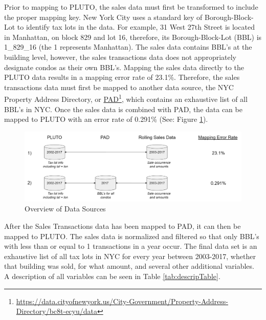 \documentclass[12pt,]{article}
\let\rmarkdownfootnote\footnote%
\def\footnote{\protect\rmarkdownfootnote}
\begin{document}
Prior to mapping to PLUTO, the sales data must first be transformed to
include the proper mapping key. New York City uses a standard key of
Borough-Block-Lot to identify tax lots in the data. For example, 31 West
27th Street is located in Manhattan, on block 829 and lot 16, therefore,
its Borough-Block-Lot (BBL) is 1\_829\_16 (the 1 represents Manhattan).
The sales data contains BBL's at the building level, however, the sales
transactions data does not appropriately designate condos as their own
BBL's. Mapping the sales data directly to the PLUTO data results in a
mapping error rate of 23.1\%. Therefore, the sales transactions data
must first be mapped to another data source, the NYC Property Address
Directory, or
\href{https://data.cityofnewyork.us/City-Government/Property-Address-Directory/bc8t-ecyu/data}{PAD}\footnote{\url{https://data.cityofnewyork.us/City-Government/Property-Address-Directory/bc8t-ecyu/data}},
which contains an exhaustive list of all BBL's in NYC. Once the sales
data is combined with PAD, the data can be mapped to PLUTO with an error
rate of 0.291\% (See: Figure \ref{fig:Data Schema}).

\begin{figure}[H]
\includegraphics[width=1\linewidth]{Sections/tables and figures/Data Schema} \caption{Overview of Data Sources}\label{fig:Data Schema}
\end{figure}

After the Sales Transactions data has been mapped to PAD, it can then be
mapped to PLUTO. The sales data is normalized and filtered so that only
BBL's with less than or equal to 1 transactions in a year occur. The
final data set is an exhaustive list of all tax lots in NYC for every
year between 2003-2017, whether that building was sold, for what amount,
and several other additional variables. A description of all variables
can be seen in Table \ref{tab:descripTable}.
\end{document}
